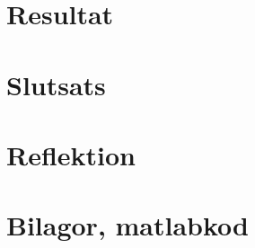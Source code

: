 \documentclass[12pt]{article}
\begin{document}
\section{Resultat}

\section{Slutsats}

\section{Reflektion}

\section{Bilagor, matlabkod}
\label{sec:bilagor}

%
\end{document}
